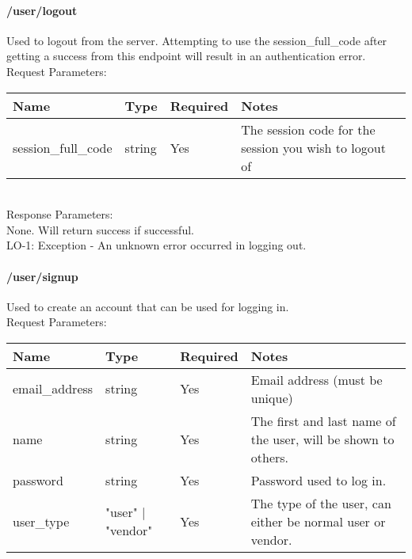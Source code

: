 \documentclass{article}[11pt]
\begin{document}
\paragraph{/user/logout}\textbf{}

Used to logout from the server. Attempting to use the session\_full\_code after getting a success from this endpoint will result in an authentication error.  \\

\noindent
Request Parameters:

\noindent
\begin{tabular}{|l|l|l|l|}
\hline
\textbf{Name} & \textbf{Type} & \textbf{Required} & \textbf{Notes} \\
\hline
session\_full\_code & string & Yes & The session code for the session you wish to logout of \\
\hline
\end{tabular} \\

\noindent
Response Parameters: \\
None. Will return success if successful. \\

\ErrorsSession
LO-1: Exception - An unknown error occurred in logging out.

\newpage

\paragraph{/user/signup}\textbf{}

Used to create an account that can be used for logging in.  \\

\noindent
Request Parameters:

\noindent
\begin{tabular}{|l|l|l|l|}
\hline
\textbf{Name} & \textbf{Type} & \textbf{Required} & \textbf{Notes} \\
\hline
email\_address & string & Yes & Email address (must be unique) \\
\hline
name & string & Yes & The first and last name of the user, will be shown to others. \\
\hline
password & string & Yes & Password used to log in. \\
\hline
user\_type & "user" $\vert$ "vendor" & Yes & The type of the user, can either be normal user or vendor. \\
\hline
\end{tabular} \\
\end{document}
